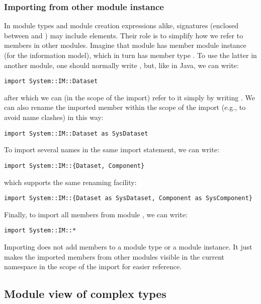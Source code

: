 \documentclass[droidmono,libertine,twoside,user,unofficial]{ecarticle}
\def\<#1>{\synt{#1}}
\begin{document}
\subsubsection*{Importing from other module instance}

In module types and module creation expressions alike, signatures
(enclosed between \lit{\{} and \lit{\}}) may include \<import>
elements.  Their role is to simplify how we refer to members in other
modules.  Imagine that module  has member module
instance  (for the information model), which in turn has
member type .  To use the latter in another module, one
should normally write , but, like in Java, we
can write:
\begin{lstlisting}
import System::IM::Dataset
\end{lstlisting}
after which we can (in the scope of the import) refer to it simply by
writing .  We can also rename the imported member within
the scope of the import (e.g., to avoid name clashes) in this way:
\begin{lstlisting}
import System::IM::Dataset as SysDataset
\end{lstlisting}

To import several names in the same import statement, we can write:
\begin{lstlisting}
import System::IM::{Dataset, Component}
\end{lstlisting}
which supports the same renaming facility:
\begin{lstlisting}
import System::IM::{Dataset as SysDataset, Component as SysComponent}
\end{lstlisting}

Finally, to import all members from module , we can write:
\begin{lstlisting}
import System::IM::*
\end{lstlisting}

Importing does not add members to a module type or a module instance.
It just makes the imported members from other modules visible in the
current namespace in the scope of the import for easier reference.


\subsection{Module view of complex types}
\label{sec:module-view-complex}
\end{document}
